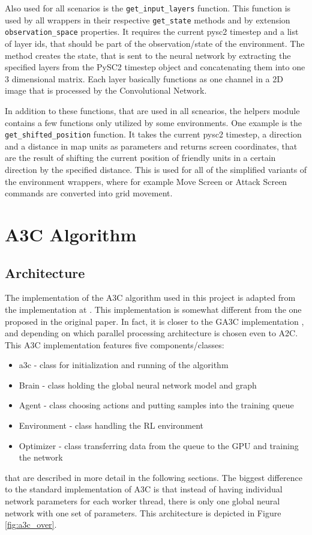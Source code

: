 Also used for all scenarios is the \lstinline{get_input_layers} function. This function is used by all wrappers in their respective \lstinline{get_state} methods and by extension \lstinline{observation_space} properties. It requires the current pysc2 timestep and a list of layer ids, that should be part of the observation/state of the environment. The method creates the state, that is sent to the neural network by extracting the specified layers from the PySC2 timestep object and concatenating them into one 3 dimensional matrix. Each layer basically functions as one channel in a 2D image that is processed by the Convolutional Network.  

In addition to these functions, that are used in all scnearios, the helpers module contains a few functions only utilized by some environments.
One example is the \lstinline{get_shifted_position} function. It takes the current pysc2 timestep, a direction and a distance in map units as parameters and returns screen coordinates, that are the result of shifting the current position of friendly units in a certain direction by the specified distance. This is used for all of the simplified variants of the environment wrappers, where for example Move Screen or Attack Screen commands are converted into grid movement.

\section{A3C Algorithm}
\label{sec:ac3impl}
\subsection{Architecture}
The implementation of the A3C algorithm used in this project is adapted from the implementation at \citep{a3ccartpole}.
This implementation is somewhat different from the one proposed in the original paper. In fact, it is closer to the GA3C implementation \citep{DBLP:journals/corr/BabaeizadehFTCK16}, and depending on which parallel processing architecture is chosen even to A2C.
\newpage
This A3C implementation features five components/classes:
\begin{itemize}
\item a3c - class for initialization and running of the algorithm
\item Brain - class holding the global neural network model and graph
\item Agent - class choosing actions and putting samples into the training queue
\item Environment - class handling the RL environment
\item Optimizer - class transferring data from the queue to the GPU and training the network
\end{itemize}
that are described in more detail in the following sections.
The biggest difference to the standard implementation of A3C is that instead of having individual network parameters for each worker thread, there is only one global neural network with one set of parameters. This architecture is depicted in Figure \ref{fig:a3c_over}. 

